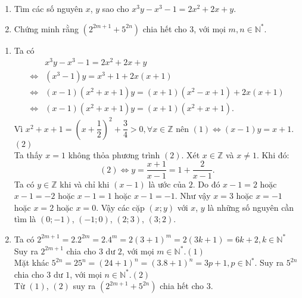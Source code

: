 \begin{ex}%
\hfill
    \begin{enumerate}    
        \item Tìm các số nguyên  $x$, $y$  sao cho $x^{3}y-x^{3}-1=2x^{2}+2x+y$.
        \item Chứng minh rằng $\left( 2^{2m+1}+5^{2n} \right)$ chia hết cho $3$, với mọi $m,n\in \mathbb{N}^*$.
      \end{enumerate}
\loigiai
    {
    \begin{enumerate}
        \item Ta có 
      {\allowdisplaybreaks
      	\begin{align*}
      	&x^3y - x^3 - 1 = 2x^2 + 2x + y \\
      	\Leftrightarrow& (x^3 - 1)y = x^3 + 1 + 2x(x + 1)\\
       \Leftrightarrow& (x - 1)(x^2 + x + 1)y = (x + 1)(x^2 - x + 1) + 2x(x + 1)\\                         
      \Leftrightarrow& (x - 1)(x^2 + x + 1)y = (x + 1)(x^2 + x + 1).\tag{1}
      \end{align*}}Vì $x^2 + x + 1 = \left( x + \dfrac{1}{2} \right)^2 + \dfrac{3}{4} > 0,\forall x \in \mathbb{Z}$ nên 
    $(1) \Leftrightarrow (x - 1)y = x + 1$.\hfill$(2)$\\
     Ta thấy $x = 1$ không thỏa phương trình $(2)$. Xét $x \in \mathbb{Z}$ và $x \ne 1$. Khi đó:
     \[(2) \Leftrightarrow y = \frac{x + 1}{x - 1} = 1 + \frac{2}{x - 1}.\]
    Ta có $y \in \mathbb{Z}$ khi và chỉ khi $\left( x - 1 \right)$ là ước của $2$. 
        Do đó $x - 1 = 2$ hoặc $x - 1 =  - 2$ hoặc $x - 1 = 1$ hoặc $x - 1 =  - 1$. Như vậy $x = 3$ hoặc $x =  - 1$ hoặc $x = 2$ hoặc $x = 0$.        Vậy các cặp $(x;y)$ với $x$, $y$ là những số nguyên cần tìm là $(0; - 1)$, $( - 1;0)$, $(2;3)$, $(3;2)$.
    \item  Ta có $2^{2m + 1} = 2.2^{2m} = 2.4^m = 2(3 + 1)^m = 2(3k + 1) = 6k + 2,k \in \mathbb{N}^*$
    Suy ra $2^{2m + 1}$ chia cho $3$ dư $2$, với mọi $m \in \mathbb{N}^*$.\hfill$(1)$\\
    Mặt khác $5^{2n} = 25^n = (24 + 1)^n = (3.8 + 1)^n = 3p + 1,p \in \mathbb{N}^*$.
    Suy ra $5^{2n}$ chia cho $3$ dư $1$,  với mọi $n \in \mathbb{N}^*$.\hfill$(2)$\\
    Từ $(1)$, $(2)$ suy ra $\left( 2^{2m + 1} + 5^{2n} \right)$ chia hết cho $3$.
    \end{enumerate}
    }
\end{ex}

